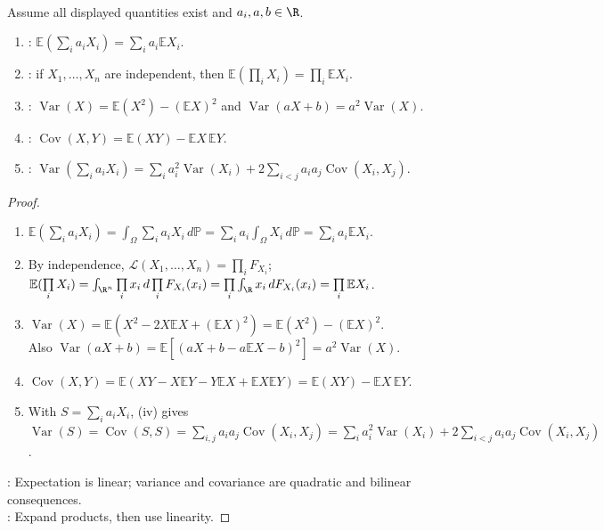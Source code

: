 \begin{theorem} \label{thm:expectation-variance-covariance-rules} \\
Assume all displayed quantities exist and $a_i,a,b\in\R$.
\begin{enumerate}[label=(\roman*)]
\setlength{\itemsep}{0pt}
\item {}: $\mathbb{E}(\sum\limits_i a_iX_i)=\sum\limits_i a_i\mathbb{E}X_i$.
\item {}: if $X_1,\ldots,X_n$ are independent, then $\mathbb{E}(\prod\limits_i X_i)=\prod\limits_i\mathbb{E}X_i$.
\item {}: $\operatorname{Var}(X)=\mathbb{E}(X^2)-(\mathbb{E}X)^2$ and $\operatorname{Var}(aX+b)=a^2\operatorname{Var}(X)$.
\item {}: $\operatorname{Cov}(X,Y)=\mathbb{E}(XY)-\mathbb{E}X\,\mathbb{E}Y$.
\item {}: $\operatorname{Var}(\sum\limits_i a_iX_i)=\sum\limits_i a_i^2\operatorname{Var}(X_i)+2\sum\limits_{i<j}a_ia_j\operatorname{Cov}(X_i,X_j)$.
\end{enumerate}
\begin{proof}
\begin{enumerate}[label=(\roman*)]
\setlength{\itemsep}{0pt}
\item $\mathbb{E}(\sum\limits_i a_iX_i)=\int_\Omega\sum\limits_i a_iX_i\,d\mathbb{P}=\sum\limits_i a_i\int_\Omega X_i\,d\mathbb{P}=\sum\limits_i a_i\mathbb{E}X_i$.
\item By independence, $\mathcal{L}(X_1,\ldots,X_n)=\prod\limits_i F_{X_i}$; $\mathbb{E}(\prod\limits_i X_i)=\int_{\R^n}\prod\limits_i x_i\,d\prod\limits_i F_{X_i}(x_i)=\prod\limits_i\int_\R x_i\,dF_{X_i}(x_i)=\prod\limits_i\mathbb{E}X_i$.
\item $\operatorname{Var}(X)=\mathbb{E}(X^2-2X\mathbb{E}X+(\mathbb{E}X)^2)=\mathbb{E}(X^2)-(\mathbb{E}X)^2$.\\
Also $\operatorname{Var}(aX+b)=\mathbb{E}[(aX+b-a\mathbb{E}X-b)^2]=a^2\operatorname{Var}(X)$.
\item $\operatorname{Cov}(X,Y)=\mathbb{E}(XY-X\mathbb{E}Y-Y\mathbb{E}X+\mathbb{E}X\mathbb{E}Y)=\mathbb{E}(XY)-\mathbb{E}X\,\mathbb{E}Y$.
\item With $S=\sum\limits_i a_iX_i$, (iv) gives\\
$\operatorname{Var}(S)=\operatorname{Cov}(S,S)=\sum\limits_{i,j}a_ia_j\operatorname{Cov}(X_i,X_j)=\sum\limits_i a_i^2\operatorname{Var}(X_i)+2\sum\limits_{i<j}a_ia_j\operatorname{Cov}(X_i,X_j)$.
\end{enumerate}
: Expectation is linear; variance and covariance are quadratic and bilinear consequences.\\
: Expand products, then use linearity.
\end{proof}
\end{theorem}

